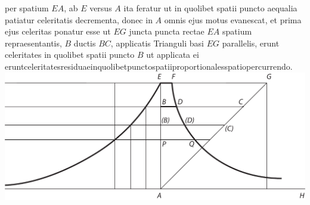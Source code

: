 \noindent
{}
per spatium $\displaystyle EA$, ab $\displaystyle E$ versus $\displaystyle A$ ita feratur
ut in quolibet spatii puncto aequalia patiatur celeritatis decrementa\protect{},
donec in $\displaystyle A$ omnis ejus motus evanescat,
et prima ejus celeritas\protect{} ponatur esse ut $\displaystyle EG$ juncta
puncta rectae $\displaystyle EA$ spatium repraesentantis,
$\displaystyle B$ ductis $\displaystyle BC$,
applicatis Trianguli 
basi $\displaystyle EG$ parallelis,
erunt celeritates in quolibet spatii puncto $\displaystyle B$ ut applicata ei
erunt\hfill celeritates\hfill residuae\hfill in\hfill quolibet\hfill puncto\hfill spatii\hfill proportionales\hfill spatio\hfill percurrendo.
\pend
\pstart
\noindent
    \includegraphics[trim = 0mm -3mm 0mm 0mm, clip,width=1.0\textwidth]{images/lh0350911_009v-d1.pdf}
    \label{035,09,11_009v_Fig.3}  %
   \pend
   \vspace{1.5em}
\pstart\noindent{}
